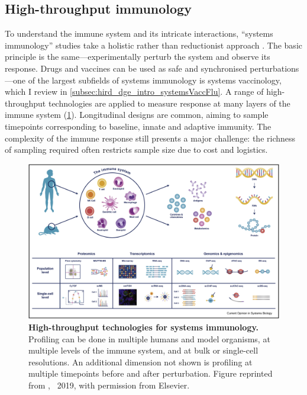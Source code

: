 \begin{outline}
\subsection{High-throughput immunology}

To understand the immune system and its intricate interactions,
\enquote{systems immunology} studies take a holistic rather than reductionist approach \autocite{davis2017SystemsImmunologyJust,villani2018SystemsImmunologyLearning,pulendran2020ScienceMedicineHuman}.
The basic principle is the same---experimentally perturb the system and observe its response.
Drugs and vaccines can be used as safe and synchronised perturbations---one of the largest subfields of systems immunology is systems vaccinology, which I review in \cref{subsec:hird_dge_intro_systemsVaccFlu}.
A range of high-throughput technologies are applied to measure response at many layers of the immune system (\cref{fig:intro_sysImmunology}).
Longitudinal designs are common, aiming to sample timepoints corresponding to baseline, innate and adaptive immunity.
The complexity of the immune response still presents a major challenge:
the richness of sampling required often restricts sample size due to cost and logistics.

\begin{figure}
    \centering
    \includegraphics[width=1.0\textwidth,page=1]{mainmatter/figures/chapter_01/yu2019SystemsImmunologyIntegrating/1-s2.0-S2452310018301197-gr1_lrg.jpg}
    \caption{
        \textbf{High-throughput technologies for systems immunology.}
        Profiling can be done in multiple humans and model organisms, at multiple levels of the immune system, and at bulk or single-cell resolutions.
        An additional dimension not shown is profiling at multiple timepoints before and after perturbation.
        Figure reprinted from \textcite{yu2019SystemsImmunologyIntegrating}, \textcopyright~2019, with permission from Elsevier.
    }
    \label{fig:intro_sysImmunology}
\end{figure}


\end{outline}

